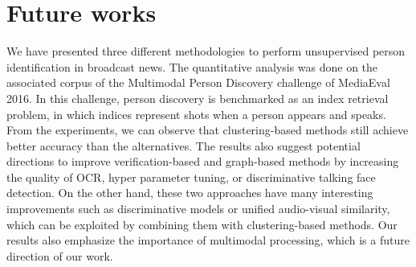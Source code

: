 \section{Future works}
\label{sec:discuss}

We have presented three different methodologies to perform unsupervised person identification in broadcast news. The quantitative analysis was done on the associated corpus of the Multimodal Person Discovery challenge of MediaEval 2016. In this challenge, person discovery is benchmarked as an index retrieval problem, in which indices represent shots when a person appears and speaks.
%
%
From the experiments, we can observe that clustering-based methods still achieve better accuracy than the alternatives. The results also suggest potential directions to improve verification-based and graph-based methods
%
by increasing the quality of OCR, hyper parameter tuning, or discriminative talking face detection.
%
%
On the other hand, these two approaches have many interesting improvements such as discriminative models or unified audio-visual similarity, which can be exploited by combining them with clustering-based methods.
%
Our results also emphasize the importance of multimodal processing, which is a future direction of our work.


\endinput
